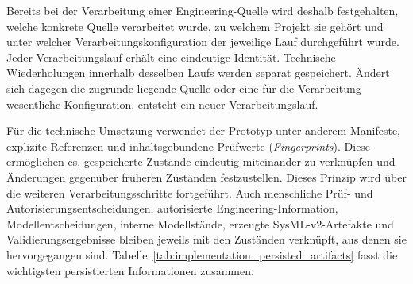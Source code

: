 Bereits bei der Verarbeitung einer Engineering-Quelle wird deshalb
festgehalten, welche konkrete Quelle verarbeitet wurde, zu welchem Projekt
sie gehört und unter welcher Verarbeitungskonfiguration der jeweilige Lauf
durchgeführt wurde. Jeder Verarbeitungslauf erhält eine eindeutige Identität.
Technische Wiederholungen innerhalb desselben Laufs werden separat
gespeichert. Ändert sich dagegen die zugrunde liegende Quelle oder eine für
die Verarbeitung wesentliche Konfiguration, entsteht ein neuer
Verarbeitungslauf.

Für die technische Umsetzung verwendet der Prototyp unter anderem
Manifeste, explizite Referenzen und inhaltsgebundene Prüfwerte
(\emph{Fingerprints}). Diese ermöglichen es, gespeicherte Zustände eindeutig
miteinander zu verknüpfen und Änderungen gegenüber früheren Zuständen
festzustellen.
\newpage
Dieses Prinzip wird über die weiteren Verarbeitungsschritte fortgeführt.
Auch menschliche Prüf- und Autorisierungsentscheidungen, autorisierte
Engineering-Information, Modellentscheidungen, interne Modellstände,
erzeugte SysML-v2-Artefakte und Validierungsergebnisse bleiben jeweils mit
den Zuständen verknüpft, aus denen sie hervorgegangen sind.
Tabelle~\ref{tab:implementation_persisted_artifacts} fasst die wichtigsten
persistierten Informationen zusammen.

